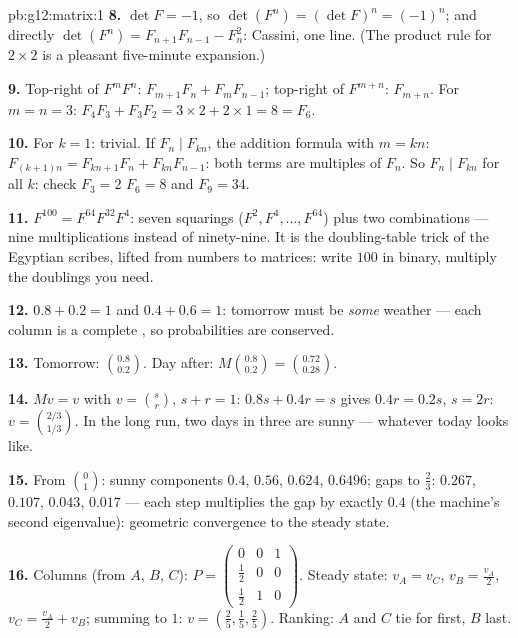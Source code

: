 \begin{solution}{pb:g12:matrix:1}
\textbf{8.} $\det F = -1$, so
$\det(F^n) = (\det F)^n = (-1)^n$; and directly
$\det(F^n) = F_{n+1}F_{n-1} - F_n^2$: Cassini, one line. (The
product rule for $2 \times 2$  is a pleasant
five-minute expansion.)

\textbf{9.} Top-right of $F^m F^n$:
$F_{m+1}F_n + F_m F_{n-1}$; top-right of $F^{m+n}$:
$F_{m+n}$. For $m = n = 3$:
$F_4 F_3 + F_3 F_2 = 3 \times 2 + 2 \times 1 = 8 = F_6$.

\textbf{10.} For $k = 1$: trivial. If $F_n \mid F_{kn}$, the
addition formula with $m = kn$:
$F_{(k+1)n} = F_{kn+1}F_n + F_{kn}F_{n-1}$: both terms are
multiples of $F_n$. So $F_n \mid F_{kn}$ for all $k$: check
$F_3 = 2$  $F_6 = 8$ and $F_9 = 34$.

\textbf{11.} $F^{100} = F^{64} F^{32} F^4$: seven squarings
($F^2, F^4, \dots, F^{64}$) plus two combinations --- nine
multiplications instead of ninety-nine. It is the
doubling-table trick of the Egyptian scribes, lifted from
numbers to matrices: write $100$ in binary, multiply the
doublings you need.

\textbf{12.} $0.8 + 0.2 = 1$ and $0.4 + 0.6 = 1$: tomorrow
must be \emph{some} weather --- each column is a complete
 , so probabilities are conserved.

\textbf{13.} Tomorrow: $\binom{0.8}{0.2}$. Day after:
$M\binom{0.8}{0.2} = \binom{0.72}{0.28}$.

\textbf{14.} $Mv = v$ with $v = \binom{s}{r}$, $s + r = 1$:
$0.8s + 0.4r = s$ gives $0.4r = 0.2s$, $s = 2r$:
$v = \binom{2/3}{1/3}$. In the long run, two days in three are
sunny --- whatever today looks like.

\textbf{15.} From $\binom01$: sunny components $0.4$, $0.56$,
$0.624$, $0.6496$; gaps to $\frac23$: $0.267$, $0.107$,
$0.043$, $0.017$ --- each step multiplies the gap by exactly
$0.4$ (the machine's second eigenvalue): geometric
convergence to the steady state.

\textbf{16.} Columns (from $A$, $B$, $C$):
$P = \begin{pmatrix} 0 & 0 & 1\\ \frac12 & 0 & 0\\
\frac12 & 1 & 0\end{pmatrix}$. Steady state: $v_A = v_C$,
$v_B = \frac{v_A}{2}$, $v_C = \frac{v_A}{2} + v_B$; summing to
$1$: $v = \left(\frac25, \frac15, \frac25\right)$. Ranking:
$A$ and $C$ tie for first, $B$ last.


\end{solution}
